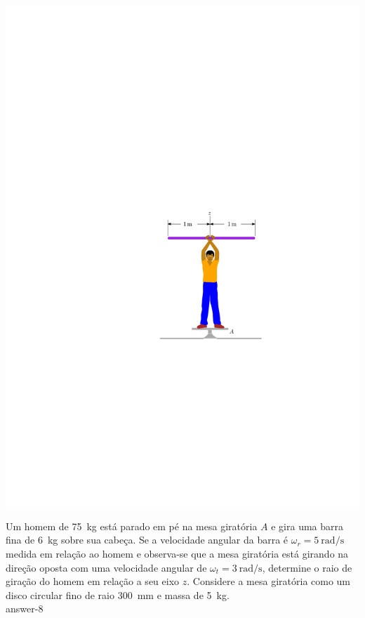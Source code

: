 \begin{minipage}{.5\linewidth}
	\begin{flushleft}
		\includegraphics[scale=1.2]{../../images/draw_5}
	\end{flushleft}
\end{minipage}
\begin{minipage}{.5\linewidth}
	\item Um homem de \SI{75}{\kilogram} está parado em pé na mesa giratória $A$ e gira uma barra fina de \SI{6}{\kilogram} sobre sua cabeça. Se a velocidade angular da barra é $\omega_{r}=\SI{5}{\radian/\second}$ medida em relação ao homem e observa-se que a mesa giratória está girando na direção oposta com uma velocidade angular de $\omega_{t}=\SI{3}{\radian/\second}$, determine o raio de giração do homem em relação a seu eixo $z$. Considere a mesa giratória como um disco circular fino de raio \SI{300}{\milli\meter} e massa de \SI{5}{\kilogram}.\\
	
	{answer-8}
\end{minipage}